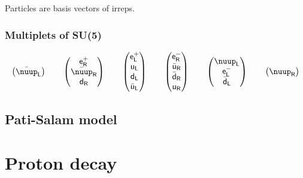 \documentclass[english, fleqn]{beamer}
\begin{document}
\begin{frame}
    Particles are basis vectors of irreps.
\end{frame}

\begin{frame}
    \frametitle{Multiplets of SU(5)}
    \[
        \begin{pmatrix}
            \bar\nuup_\mathsf L
        \end{pmatrix}
        \qquad
        \begin{pmatrix}
            \mathsf e^+_\mathsf R \\
            \bar\nuup_\mathsf R \\
            \mathsf d_\mathsf R
        \end{pmatrix}
        \qquad
        \begin{pmatrix}
            \mathsf e^+_\mathsf L \\
            \mathsf u_\mathsf L \\
            \mathsf d_\mathsf L \\
            \bar{\mathsf u}_\mathsf L
        \end{pmatrix}
        \qquad
        \begin{pmatrix}
            \mathsf e^-_\mathsf R \\
            \bar{\mathsf u}_\mathsf R \\
            \bar{\mathsf d}_\mathsf R \\
            \mathsf u_\mathsf R
        \end{pmatrix}
        \qquad
        \begin{pmatrix}
            \nuup_\mathsf L \\
            \mathsf e^-_\mathsf L \\
            \bar{\mathsf d}_\mathsf L
        \end{pmatrix}
        \qquad
        \begin{pmatrix}
            \nuup_\mathsf R
        \end{pmatrix}
    \]
\end{frame}

\subsection{Pati-Salam model}

\begin{frame}
\end{frame}

\section{Proton decay}
\end{document}
